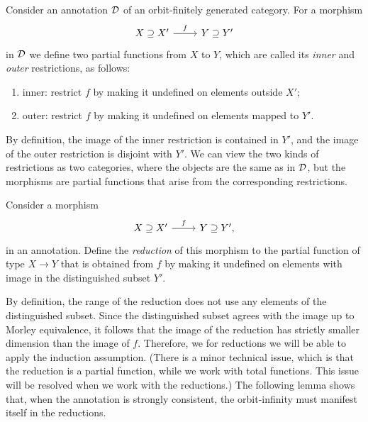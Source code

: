 Consider an annotation ${\mathcal D}$ of an orbit-finitely generated category. For a morphism 
\[
\begin{tikzcd}
X \supseteq X' \ar[r, "f"] & Y \supseteq Y'
\end{tikzcd}
\]
in ${\mathcal D}$ we define two partial functions from $X$ to $Y$, which are called its \emph{inner} and \emph{outer} restrictions, as follows:
\begin{enumerate}
    \item inner: restrict $f$ by making it undefined on elements outside $X'$;
    \item outer: restrict $f$ by making it undefined on elements mapped to $Y'$.
\end{enumerate}
By definition, the image of the inner restriction is contained in $Y'$, and the image of the outer restriction is disjoint with $Y'$. We can view the two kinds of restrictions as two categories, where the objects are the same as in ${\mathcal D}$, but the morphisms are partial functions that arise from the corresponding restrictions.



\begin{definition}
    [Reduction] Consider a morphism 
  \[
        \begin{tikzcd}
        X \supseteq X' \ar[r, "f"] & Y \supseteq Y',
        \end{tikzcd}
        \]
in an annotation. Define the \emph{reduction} of this morphism to  the partial function of type $X \to Y$ that is obtained from $f$ by making it undefined on elements with image in the distinguished subset $Y'$. 
\end{definition}
By definition, the range of the reduction does not use any elements of the distinguished subset. Since the distinguished subset agrees with the image up to Morley equivalence, it follows that the image of the reduction  has strictly smaller dimension than the image of $f$.  Therefore, we for reductions we will be able to apply the induction assumption. (There is a minor technical issue, which is that the reduction is a partial function, while we work with total functions. This issue will be resolved when we work with the reductions.) The following lemma shows that, when the annotation is strongly consistent, the orbit-infinity must manifest itself in the reductions. 

